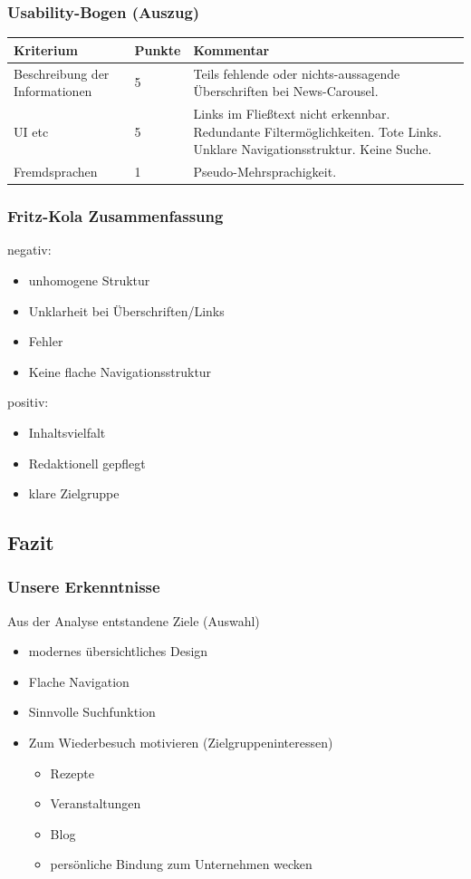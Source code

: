 \begin{frame}
	\frametitle{Usability-Bogen (Auszug)}
	\begin{tabular}{|p{}|l|p{6cm}|}
	  \hline
	  Kriterium & Punkte & Kommentar \\ \hline
	  Beschreibung der Informationen & 5 & Teils fehlende oder nichts-aussagende Überschriften bei News-Carousel.  \\ \hline	
	  
	  UI etc & 5 & Links im Fließtext nicht erkennbar. Redundante Filtermöglichkeiten. Tote Links. Unklare Navigationsstruktur. Keine Suche.  \\ \hline		
	  Fremdsprachen & 1 & Pseudo-Mehrsprachigkeit.  \\ \hline		
	\end{tabular}
\end{frame}

\begin{frame}
	\frametitle{Fritz-Kola Zusammenfassung}
	negativ:
	\begin{itemize}
		\item unhomogene Struktur
		\item Unklarheit bei Überschriften/Links
		\item Fehler
		\item Keine flache Navigationsstruktur
	\end{itemize}
	
	positiv:
	\begin{itemize}
		\item Inhaltsvielfalt
		\item Redaktionell gepflegt
		\item klare Zielgruppe
	\end{itemize}
\end{frame}

\subsection{Fazit}
\begin{frame}
	\frametitle{Unsere Erkenntnisse}
	Aus der Analyse entstandene Ziele (Auswahl)
	\begin{itemize}
		\item modernes übersichtliches Design %
		\item Flache Navigation
		\item Sinnvolle Suchfunktion %
		\item Zum Wiederbesuch motivieren (Zielgruppeninteressen)
			\begin{itemize}
				\item Rezepte
				\item Veranstaltungen
				\item Blog
				\item persönliche Bindung zum Unternehmen wecken
			\end{itemize}
	\end{itemize}
\end{frame}

